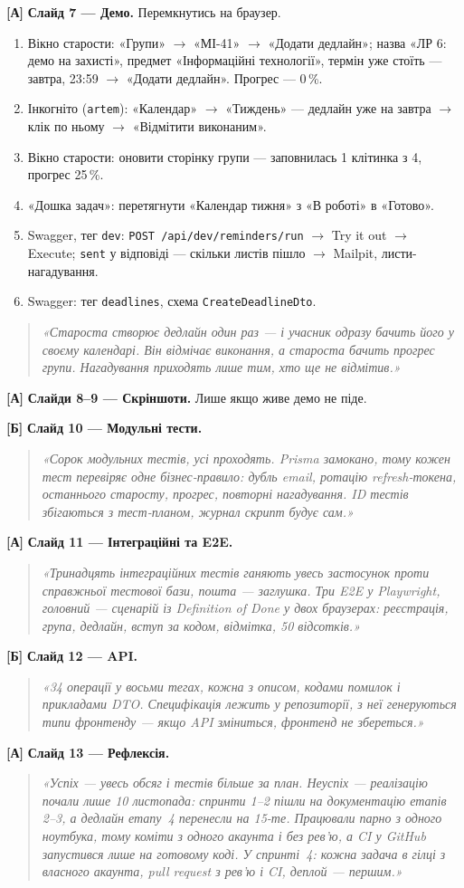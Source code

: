 \documentclass[11pt]{article}
\newcommand{\say}[1]{\begin{quote}\itshape «#1»\end{quote}}
\newcommand{\who}[1]{\textcolor{accent}{\textbf{[#1]}}}
\begin{document}
\who{А} \textbf{Слайд 7 --- Демо.} Перемкнутись на браузер.
\begin{enumerate}[leftmargin=2.2em,itemsep=1pt,topsep=3pt]
  \item Вікно старости: «Групи» $\to$ «МІ-41» $\to$ «Додати дедлайн»; назва «ЛР 6: демо на захисті», предмет «Інформаційні технології», термін уже стоїть --- завтра, 23:59 $\to$ «Додати дедлайн». Прогрес --- 0\,\%.
  \item Інкогніто (\texttt{artem}): «Календар» $\to$ «Тиждень» --- дедлайн уже на завтра $\to$ клік по ньому $\to$ «Відмітити виконаним».
  \item Вікно старости: оновити сторінку групи --- заповнилась 1 клітинка з 4, прогрес 25\,\%.
  \item «Дошка задач»: перетягнути «Календар тижня» з «В роботі» в «Готово».
  \item Swagger, тег \texttt{dev}: \texttt{POST /api/dev/reminders/run} $\to$ Try it out $\to$ Execute; \texttt{sent} у відповіді --- скільки листів пішло $\to$ Mailpit, листи-нагадування.
  \item Swagger: тег \texttt{deadlines}, схема \texttt{CreateDeadlineDto}.
\end{enumerate}
\say{Староста створює дедлайн один раз --- і учасник одразу бачить його у своєму календарі. Він відмічає виконання, а староста бачить прогрес групи. Нагадування приходять лише тим, хто ще не відмітив.}

\who{А} \textbf{Слайди 8--9 --- Скріншоти.} Лише якщо живе демо не піде.

\who{Б} \textbf{Слайд 10 --- Модульні тести.}
\say{Сорок модульних тестів, усі проходять. Prisma замокано, тому кожен тест перевіряє одне бізнес-правило: дубль email, ротацію refresh-токена, останнього старосту, прогрес, повторні нагадування. ID тестів збігаються з тест-планом, журнал скрипт будує сам.}

\who{А} \textbf{Слайд 11 --- Інтеграційні та E2E.}
\say{Тринадцять інтеграційних тестів ганяють увесь застосунок проти справжньої тестової бази, пошта --- заглушка. Три E2E у Playwright, головний --- сценарій із Definition of Done у двох браузерах: реєстрація, група, дедлайн, вступ за кодом, відмітка, 50 відсотків.}

\who{Б} \textbf{Слайд 12 --- API.}
\say{34 операції у восьми тегах, кожна з описом, кодами помилок і прикладами DTO. Специфікація лежить у репозиторії, з неї генеруються типи фронтенду --- якщо API зміниться, фронтенд не збереться.}

\who{А} \textbf{Слайд 13 --- Рефлексія.}
\say{Успіх --- увесь обсяг і тестів більше за план. Неуспіх --- реалізацію почали лише 10 листопада: спринти 1--2 пішли на документацію етапів 2--3, а дедлайн етапу~4 перенесли на 15-те. Працювали парно з одного ноутбука, тому коміти з одного акаунта і без рев'ю, а CI у GitHub запустився лише на готовому коді. У спринті~4: кожна задача в гілці з власного акаунта, pull request з рев'ю і CI, деплой --- першим.}
\end{document}
